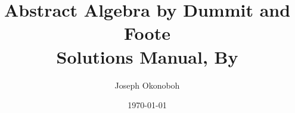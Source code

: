 \documentclass[9pt]{book}
\title{\vspace{-14cm}Abstract Algebra by Dummit and Foote \\Solutions Manual, By}
\author{Joseph Okonoboh}
\date{\today}
\newcommand{\Z}{\mathbb{Z}}
\begin{document}
   \maketitle
\begin{comment}   
   \tableofcontents

   \chapter{Preliminaries}
      \section{Basics}
         
      \section{Properties Of The Integers}
         
      \section{$\Z/n\Z$ : The Integers Modulo $n$}
         
         
   \part{}

   \chapter{Introduction To Groups}
      \section{Basic Axioms And Examples}
         
      \section{Dihedral Groups}
         
      \section{Symmetric Groups}
         
      \section{Matrix Groups}
         
      \section{The Quaternion Group}
         

\end{comment}
\end{document}
